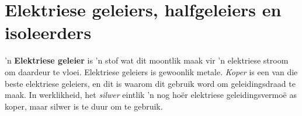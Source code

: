     \noindent



\section{Elektriese geleiers, halfgeleiers en isoleerders}
\nopagebreak

\label{m38706*id66058} 'n \textbf{Elektriese geleier} is 'n stof wat dit moontlik maak vir 'n elektriese stroom om daardeur te vloei. Elektriese geleiers is gewoonlik metale. \textsl{Koper} is een van die beste elektriese geleiers, en
dit is waarom dit gebruik word om geleidingsdraad te maak. In werklikheid, het \textsl{silwer} eintlik 'n nog hoër elektriese geleidingsvermoë as koper, maar silwer is te duur om te gebruik.\par \\


